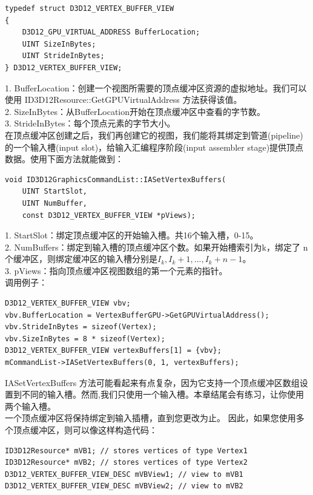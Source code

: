 \documentclass[11pt,a4paper,oldfontcommands]{memoir}
\begin{document}
{\begin{flushleft}
\begin{lstlisting}
typedef struct D3D12_VERTEX_BUFFER_VIEW
{
    D3D12_GPU_VIRTUAL_ADDRESS BufferLocation;
    UINT SizeInBytes;
    UINT StrideInBytes;
} D3D12_VERTEX_BUFFER_VIEW;
\end{lstlisting}
1. BufferLocation：创建一个视图所需要的顶点缓冲区资源的虚拟地址。我们可以使用 ID3D12Resource::GetGPUVirtualAddress 方法获得该值。\\
2. SizeInBytes：从BufferLocation开始在顶点缓冲区中查看的字节数。 \\
3. StrideInBytes：每个顶点元素的字节大小。\\
在顶点缓冲区创建之后，我们再创建它的视图，我们能将其绑定到管道(pipeline)的一个输入槽(input slot)，给输入汇编程序阶段(input assembler stage)提供顶点数据。使用下面方法就能做到：\\
\begin{lstlisting}
void ID3D12GraphicsCommandList::IASetVertexBuffers(
    UINT StartSlot,
    UINT NumBuffer,
    const D3D12_VERTEX_BUFFER_VIEW *pViews);
\end{lstlisting}
1. StartSlot：绑定顶点缓冲区的开始输入槽。共16个输入槽，0-15。\\
2. NumBuffers：绑定到输入槽的顶点缓冲区个数。如果开始槽索引为k，绑定了 n 个缓冲区，则绑定缓冲区的输入槽分别是$I_{k},I_{k}+1,...,I_{k}+n-1$。\\
3. pViews：指向顶点缓冲区视图数组的第一个元素的指针。\\
调用例子：\\
\begin{lstlisting}
D3D12_VERTEX_BUFFER_VIEW vbv;
vbv.BufferLocation = VertexBufferGPU->GetGPUVirtualAddress();
vbv.StrideInBytes = sizeof(Vertex);
vbv.SizeInBytes = 8 * sizeof(Vertex);
D3D12_VERTEX_BUFFER_VIEW vertexBuffers[1] = {vbv};
mCommandList->IASetVertexBuffers(0, 1, vertexBuffers);
\end{lstlisting}
IASetVertexBuffers 方法可能看起来有点复杂，因为它支持一个顶点缓冲区数组设置到不同的输入槽。然而,我们只使用一个输入槽。本章结尾会有练习，让你使用两个输入槽。\\
一个顶点缓冲区将保持绑定到输入插槽，直到您更改为止。 因此，如果您使用多个顶点缓冲区，则可以像这样构造代码：\\
\begin{lstlisting}
ID3D12Resource* mVB1; // stores vertices of type Vertex1
ID3D12Resource* mVB2; // stores vertices of type Vertex2
D3D12_VERTEX_BUFFER_VIEW_DESC mVBView1; // view to mVB1
D3D12_VERTEX_BUFFER_VIEW_DESC mVBView2; // view to mVB2


\end{lstlisting}
\end{flushleft}}
\end{document}
